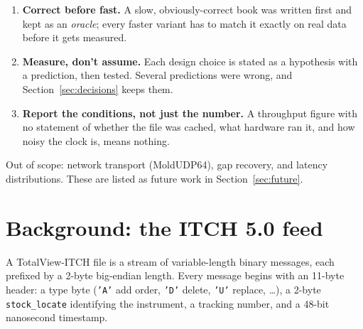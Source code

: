 \documentclass[10pt,a4paper]{article}
\newcommand{\code}[1]{\texttt{#1}}
\begin{document}
\begin{enumerate}
  \item \textbf{Correct before fast.} A slow, obviously-correct book was written first and kept as an
        \emph{oracle}; every faster variant has to match it exactly on real data before it gets measured.
  \item \textbf{Measure, don't assume.} Each design choice is stated as a hypothesis with a prediction,
        then tested. Several predictions were wrong, and Section~\ref{sec:decisions} keeps them.
  \item \textbf{Report the conditions, not just the number.} A throughput figure with no statement of whether
        the file was cached, what hardware ran it, and how noisy the clock is, means nothing.
\end{enumerate}

Out of scope: network transport (MoldUDP64), gap recovery, and latency distributions. These are listed as future work
in Section~\ref{sec:future}.

\section{Background: the ITCH 5.0 feed}
A TotalView-ITCH file is a stream of variable-length binary messages, each prefixed by a 2-byte
big-endian length. Every message begins with an 11-byte header: a type byte (\code{'A'} add order,
\code{'D'} delete, \code{'U'} replace, \ldots), a 2-byte \code{stock\_locate} identifying the instrument,
a tracking number, and a 48-bit nanosecond timestamp.

\begin{center}
\end{center}
\end{document}
